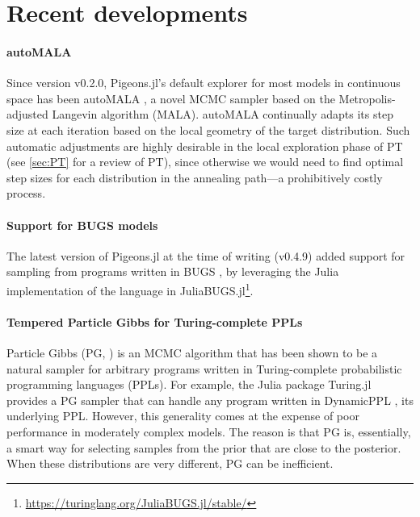 \section{Recent developments}

\paragraph{autoMALA}
Since version v0.2.0, Pigeons.jl's default explorer for most models in continuous
space has been autoMALA \citep{biron2024automala}, a novel MCMC sampler
based on the Metropolis-adjusted Langevin algorithm (MALA). autoMALA continually
adapts its step size at each iteration based on the local geometry of the target
distribution. Such automatic adjustments are highly desirable in the local exploration 
phase of PT (see \cref{sec:PT} for a review of PT), since otherwise we would 
need to find optimal step sizes for each distribution in the annealing path---a 
prohibitively costly process.

\vspace{-1em}

\paragraph{Support for BUGS models}
The latest version of Pigeons.jl at the time of writing (v0.4.9) added support 
for sampling from programs written in BUGS \cite{lunn2000winbugs,lunn2009bugs,
lunn2013bugs}, by leveraging the Julia implementation of the 
language in JuliaBUGS.jl\footnote{\url{https://turinglang.org/JuliaBUGS.jl/stable/}}.

\vspace{-1em}

\paragraph{Tempered Particle Gibbs for Turing-complete PPLs}
Particle Gibbs (PG, \citealp{andrieu2010particle}) is an MCMC
algorithm that has been shown \citep{wood2014new} to be a natural sampler for
arbitrary programs written in Turing-complete probabilistic programming 
languages (PPLs). For example, the Julia package Turing.jl \citep{ge2018turing}
provides a PG sampler that can handle any program written in DynamicPPL
\citep{tarek2020dynamicppl}, its underlying PPL.
However, this generality comes at the expense of poor performance in moderately
complex models. The reason is that PG is, essentially, a smart 
way for selecting samples from the prior that are close to the posterior.
When these distributions are very different, PG can be inefficient.


